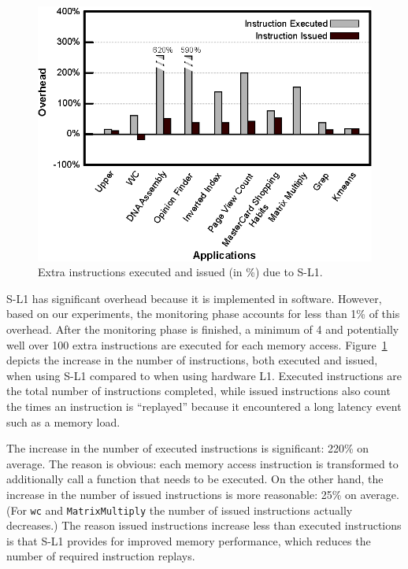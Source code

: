 \begin{figure}[t]
\center
\includegraphics[scale=0.93]{4instructionIssueOverhead.eps}
\vspace{-0.0cm}
\caption{\footnotesize\textnormal{Extra instructions executed and issued (in \%) due to S-L1.}}
\label{fig:instexecissuedoverhead}
\end{figure}

S-L1 has significant overhead because it is implemented in software. 
However, based on our experiments, the monitoring phase accounts for less than 1\% of this overhead.
After the monitoring phase is finished, a minimum of 4 and potentially well over 100 extra
instructions are executed for each memory access.
Figure~\ref{fig:instexecissuedoverhead} depicts the increase in the number of instructions, both executed and issued,
when using S-L1 compared to when using hardware L1.
Executed instructions are the total number of instructions completed, while 
issued instructions also count the times an instruction is ``replayed'' because it
encountered a long latency event such as a memory load.

The increase in the number of executed instructions is significant: 220\% on average. 
The reason is obvious: each memory access instruction is transformed to additionally call a function that needs to be executed. 
On the other hand, the increase in the number of issued instructions is more reasonable: 25\% on average. 
(For \texttt{wc} and \texttt{MatrixMultiply} the number of issued instructions actually decreases.)
The reason issued instructions increase less than executed instructions is that S-L1 provides for improved memory performance, which reduces the number of required 
instruction replays.


